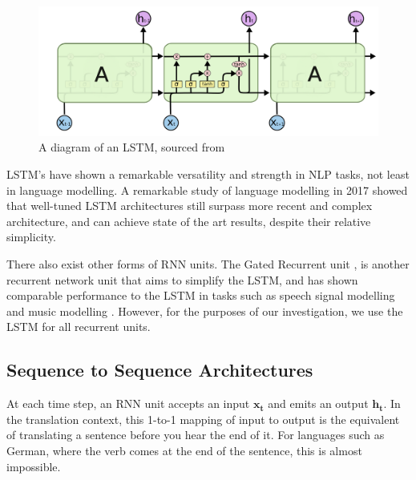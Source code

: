 \begin{figure}[tb]
    \centering
    \includegraphics[width=\linewidth]{ModelPics/LSTMcolah.png}
    \caption{A diagram of an LSTM, sourced from \cite{noauthor_understanding_nodate}}
    \label{fig:lstm_colah}{}
\end{figure}

LSTM's have shown a remarkable versatility and strength in NLP tasks, not least in language modelling. A remarkable study of language modelling in 2017 showed that well-tuned LSTM architectures still surpass more recent and complex architecture, and can achieve state of the art results, despite their relative simplicity\cite{melis_state_2017}.

There also exist other forms of RNN units. The Gated Recurrent unit \cite{cho_properties_2014}, is another recurrent network unit that aims to simplify the LSTM, and has shown comparable performance to the LSTM in tasks such as speech signal modelling and music modelling \cite{chung_empirical_2014}.
However, for the purposes of our investigation, we use the LSTM for all recurrent units.


\subsection{Sequence to Sequence Architectures} %
\label{sub:sequence_to_sequence_architectures}

At each time step, an RNN unit accepts an input $\mathbf{x_t}$ and emits an output $\mathbf{h_t}$. In the translation context, this 1-to-1 mapping of input to output is the equivalent of translating a sentence before you hear the end of it. For languages such as German, where the verb comes at the end of the sentence, this is almost impossible.


